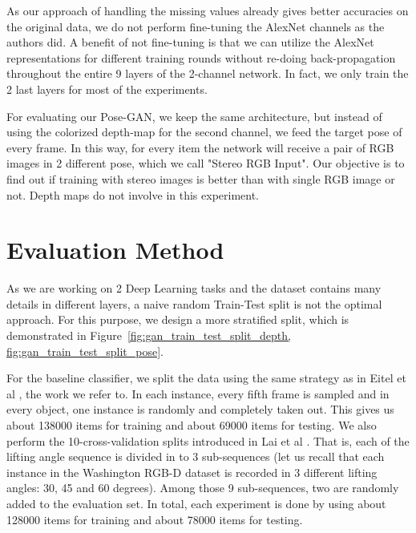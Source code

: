 As our approach of handling the missing values already gives better accuracies on the
original data, we do not perform fine-tuning the AlexNet channels as the authors did. A
benefit of not fine-tuning is that we can utilize the AlexNet representations for
different training rounds without re-doing back-propagation throughout the entire 9 layers
of the 2-channel network. In fact, we only train the 2 last layers for most of the
experiments.

For evaluating our Pose-GAN, we keep the same architecture, but instead of using the
colorized depth-map for the second channel, we feed the target pose of every frame. In
this way, for every item the network will receive a pair of RGB images in 2 different
pose, which we call "Stereo RGB Input". Our objective is to find out if training with 
stereo images is better than with single RGB image or not. Depth maps do not involve in
this experiment.

\section{Evaluation Method \label{sec:train_test_split}}
As we are working on 2 Deep Learning tasks and the dataset contains many details in
different layers, a naive random Train-Test split is not the optimal approach. For this
purpose, we design a more stratified split, which is demonstrated in
Figure~\ref{fig:gan_train_test_split_depth, fig:gan_train_test_split_pose}.

For the baseline classifier, we split the data using the same strategy as in Eitel et al
\cite{eitel}, the work we refer to. In each instance, every fifth frame is sampled
and in every object, one instance is randomly and completely taken out. This gives us
about 138000 items for training and about 69000 items for testing.  We also perform the
10-cross-validation splits introduced in Lai et al \cite{washington_rgbd}. That is, each of the
lifting angle sequence is divided in to 3 sub-sequences (let us recall that each instance
in the Washington RGB-D dataset is recorded in 3 different lifting angles: 30, 45 and 60
degrees). Among those 9 sub-sequences, two are randomly added to the evaluation set. In
total, each experiment is done by using about 128000 items for training and about 78000
items for testing.

